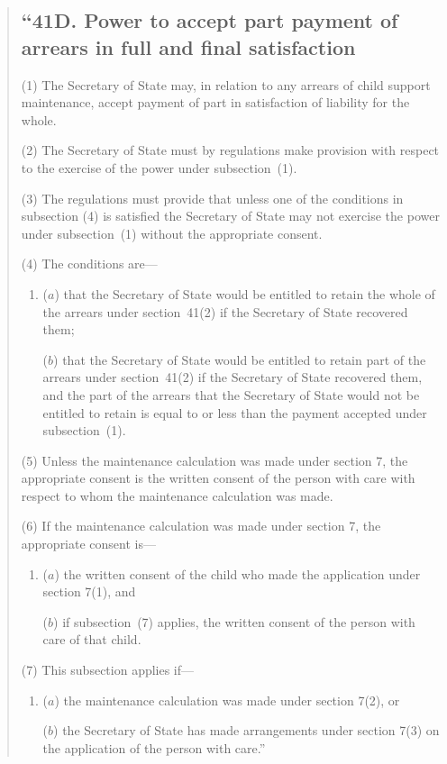 \documentclass[12pt,a4paper]{article}
\begin{document}
\begin{quotation}
\subsection*{``41D. Power to accept part payment of arrears in full and final satisfaction}

(1) The 
Secretary of State
may, in relation to any arrears of child support  maintenance, accept payment of part in satisfaction of liability for the whole.

(2)
The Secretary of State must by regulations make provision with respect to the exercise of the power under subsection~(1).

(3)
The regulations must provide that unless one of the conditions in subsection
(4)
is satisfied the 
Secretary of State %
may not exercise the power under subsection~(1) without the appropriate consent.

(4)
The conditions are---
\begin{enumerate}\item[]
($a$) that the 
Secretary of State %
would be entitled to retain the whole of the arrears under section~41(2) if 
the Secretary of State %
recovered them;

($b$) that the 
Secretary of State %
would be entitled to retain part of the arrears under section~41(2) if 
the Secretary of State %
recovered them, and the part of the arrears that the 
Secretary of State %
would not be entitled to retain is equal to or less than the payment accepted under subsection~(1).
\end{enumerate}

(5)
Unless the maintenance calculation was made under section 7, the appropriate consent is the written consent of the person with care with respect to whom the maintenance calculation was made.

(6)
If the maintenance calculation was made under section 7, the appropriate consent is---
\begin{enumerate}\item[]
($a$) the written consent of the child who made the application under section 7(1), and

($b$) if subsection~(7) applies, the written consent of the person with care of that child.
\end{enumerate}

(7) This subsection applies if---
\begin{enumerate}\item[]
($a$) the maintenance calculation was made under section 7(2), or

($b$) the Secretary of State has made arrangements under section 7(3) on the application of the person with care.''
\end{enumerate}
\end{quotation}
\end{document}
